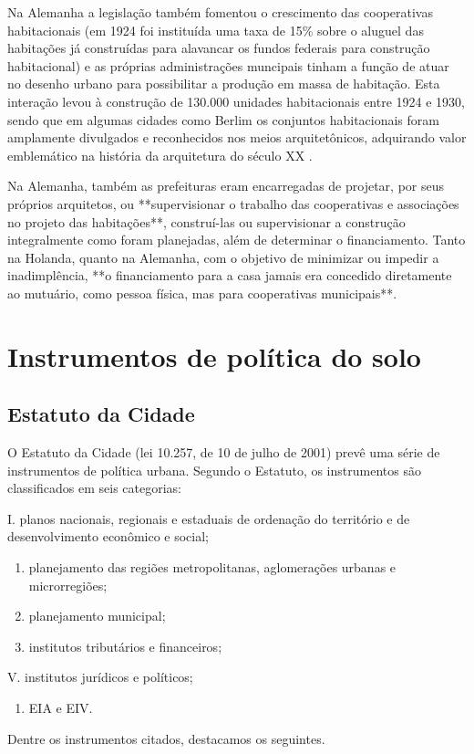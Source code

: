 \documentclass[
	12pt,				%
	oneside,			%
	a4paper,			%
	chapter=TITLE,		%
	section=TITLE,		%
	english,			%
	brazil				%
	]{abntex2}
\begin{document}
Na Alemanha a legislação também fomentou o crescimento das cooperativas
habitacionais (em 1924 foi instituída uma taxa de 15\% sobre o aluguel das
habitações já construídas para alavancar os fundos federais para construção
habitacional) e as próprias administrações muncipais tinham a função de atuar no
desenho urbano para possibilitar a produção em massa de habitação. Esta
interação levou à construção de 130.000 unidades habitacionais entre 1924 e
1930, sendo que em algumas cidades como Berlim os conjuntos habitacionais foram
amplamente divulgados e reconhecidos nos meios arquitetônicos, adquirando valor
emblemático na história da arquitetura do século XX \autocite[90]{poleto}.
\begin{citacao}
Na Alemanha, também as prefeituras eram encarregadas de projetar, por 
seus próprios arquitetos, ou **supervisionar o trabalho das cooperativas e 
associações no projeto das habitações**, construí-las ou supervisionar a 
construção integralmente como foram planejadas, além de determinar o 
financiamento.
Tanto na Holanda, quanto na Alemanha, com o objetivo de minimizar ou 
impedir a inadimplência, **o financiamento para a casa jamais era concedido 
diretamente ao mutuário, como pessoa física, mas para cooperativas municipais**.
\cite[p.~317-318]{poleto}
\end{citacao}
\hypertarget{instrumentos-de-poluxedtica-do-solo}{%
\section{Instrumentos de política do solo}\label{instrumentos-de-poluxedtica-do-solo}}

\hypertarget{estatuto-da-cidade}{%
\subsection{Estatuto da Cidade}\label{estatuto-da-cidade}}

O Estatuto da Cidade (lei 10.257, de 10 de julho de 2001) prevê uma série de
instrumentos de política urbana. Segundo o Estatuto, os instrumentos são
classificados em seis categorias:

I. planos nacionais, regionais e estaduais de ordenação do território e de
desenvolvimento econômico e social;
\begin{enumerate}
\def\labelenumi{\Roman{enumi}.}
\setcounter{enumi}{1}
\item
  planejamento das regiões metropolitanas, aglomerações urbanas e
  microrregiões;
\item
  planejamento municipal;
\item
  institutos tributários e financeiros;
\end{enumerate}
V. institutos jurídicos e políticos;
\begin{enumerate}
\def\labelenumi{\Roman{enumi}.}
\setcounter{enumi}{5}
\tightlist
\item
  \gls{EIA} e \gls{EIV}.
\end{enumerate}
Dentre os instrumentos citados, destacamos os seguintes.
\end{document}

